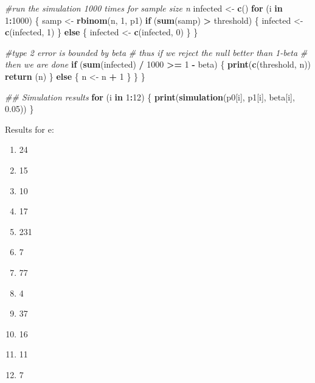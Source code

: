 \documentclass[
  12pt,
  landscape]{article}
\newenvironment{Shaded}{\begin{snugshade}}{\end{snugshade}}
\newcommand{\CommentTok}[1]{\textcolor[rgb]{0.56,0.35,0.01}{\textit{#1}}}
\newcommand{\ControlFlowTok}[1]{\textcolor[rgb]{0.13,0.29,0.53}{\textbf{#1}}}
\newcommand{\DecValTok}[1]{\textcolor[rgb]{0.00,0.00,0.81}{#1}}
\newcommand{\FloatTok}[1]{\textcolor[rgb]{0.00,0.00,0.81}{#1}}
\newcommand{\KeywordTok}[1]{\textcolor[rgb]{0.13,0.29,0.53}{\textbf{#1}}}
\newcommand{\NormalTok}[1]{#1}
\newcommand{\OperatorTok}[1]{\textcolor[rgb]{0.81,0.36,0.00}{\textbf{#1}}}
\newcommand{\StringTok}[1]{\textcolor[rgb]{0.31,0.60,0.02}{#1}}
\begin{document}
\begin{Shaded}
\begin{Highlighting}[]
        \CommentTok{#run the simulation 1000 times for sample size n}
\NormalTok{        infected <-}\StringTok{ }\KeywordTok{c}\NormalTok{()}
        \ControlFlowTok{for}\NormalTok{ (i }\ControlFlowTok{in} \DecValTok{1}\OperatorTok{:}\DecValTok{1000}\NormalTok{) \{}
\NormalTok{            samp <-}\StringTok{ }\KeywordTok{rbinom}\NormalTok{(n, }\DecValTok{1}\NormalTok{, p1)}
            \ControlFlowTok{if}\NormalTok{ (}\KeywordTok{sum}\NormalTok{(samp) }\OperatorTok{>}\StringTok{ }\NormalTok{threshold) \{}
\NormalTok{                infected <-}\StringTok{ }\KeywordTok{c}\NormalTok{(infected, }\DecValTok{1}\NormalTok{)}
\NormalTok{            \} }\ControlFlowTok{else}\NormalTok{ \{}
\NormalTok{                infected <-}\StringTok{ }\KeywordTok{c}\NormalTok{(infected, }\DecValTok{0}\NormalTok{)}
\NormalTok{            \}}
\NormalTok{        \}}
        
        \CommentTok{#type 2 error is bounded by beta}
        \CommentTok{# thus if we reject the null better than 1-beta }
        \CommentTok{# then we are done}
        \ControlFlowTok{if}\NormalTok{ (}\KeywordTok{sum}\NormalTok{(infected) }\OperatorTok{/}\StringTok{ }\DecValTok{1000} \OperatorTok{>=}\StringTok{ }\DecValTok{1} \OperatorTok{-}\StringTok{ }\NormalTok{beta) \{}
            \KeywordTok{print}\NormalTok{(}\KeywordTok{c}\NormalTok{(threshold, n))}
            \KeywordTok{return}\NormalTok{ (n)}
\NormalTok{        \} }\ControlFlowTok{else}\NormalTok{ \{}
\NormalTok{            n <-}\StringTok{ }\NormalTok{n }\OperatorTok{+}\StringTok{ }\DecValTok{1}
\NormalTok{        \}}
\NormalTok{    \}}
\NormalTok{\}}
\end{Highlighting}
\end{Shaded}

\begin{Shaded}
\begin{Highlighting}[]
\CommentTok{## Simulation results }
\ControlFlowTok{for}\NormalTok{ (i }\ControlFlowTok{in} \DecValTok{1}\OperatorTok{:}\DecValTok{12}\NormalTok{) \{}
    \KeywordTok{print}\NormalTok{(}\KeywordTok{simulation}\NormalTok{(p0[i], p1[i], beta[i], }\FloatTok{0.05}\NormalTok{))}
\NormalTok{\}}
\end{Highlighting}
\end{Shaded}

Results for e:

\begin{enumerate}
\def\labelenumi{\arabic{enumi})}
\item
  24
\item
  15
\item
  10
\item
  17
\item
  231
\item
  7
\item
  77
\item
  4
\item
  37
\item
  16
\item
  11
\item
  7
\end{enumerate}
\end{document}
